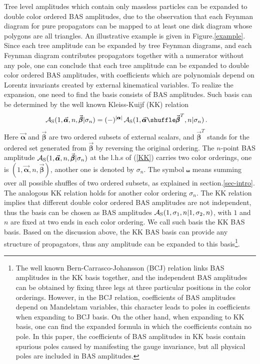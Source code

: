 \documentclass[11pt,a4paper]{article}
\newcommand{\bea}{\begin{eqnarray}}
\newcommand{\eea}{\end{eqnarray}}
\def\eref#1{(\ref{#1})}
\def\a{{\alpha}}
\def\b{{\beta}}
\begin{document}
Tree level amplitudes which contain only massless particles can be expanded to double color ordered BAS amplitudes,
due to the observation that each Feynman diagram for pure propagators can be mapped to at least one disk diagram whose polygons are all triangles. An illustrative example is given in Figure.\ref{example}. Since each tree amplitude can be expanded by tree Feynman diagrams, and each Feynman diagram contributes propagators together with a numerator without any pole, one can conclude that each tree amplitude can be expanded to double color ordered BAS amplitudes, with coefficients which are polynomials depend on Lorentz invariants created by external kinematical variables.
To realize the expansion, one need to find the basis consists of BAS amplitudes.
Such basis can be determined by the well known Kleiss-Kuijf (KK) relation \cite{Kleiss:1988ne}
%
\bea
{\cal A}_{\rm S}(1,\vec{\pmb{\a}},n,\vec{\pmb{\b}}|\sigma_n)=(-)^{|\pmb{\a}|}\,{\cal A}_{\rm S}(1,\vec{\pmb{\a}}\shuffle\vec{\pmb{\b}}^T,n|\sigma_n)\,.~~~\label{KK}
\eea
%
Here $\vec{\pmb{\a}}$ and $\vec{\pmb{\b}}$ are two ordered subsets of external scalars, and $\vec{\pmb{\b}}^T$ stands for the ordered set generated from $\vec{\pmb{\b}}$ by reversing the original ordering. The $n$-point BAS amplitude ${\cal A}_{\rm S}(1,\vec{\pmb{\a}},n,\vec{\pmb{\b}}|\sigma_n)$ at the l.h.s of \eref{KK} carries two color orderings, one is $(1,\vec{\pmb{\a}},n,\vec{\pmb{\b}})$, another one is denoted by $\sigma_n$. The symbol $\shuffle$ means summing over all
possible shuffles of two ordered subsets, as explained in section.\ref{sec-intro}.
The analogous KK relation holds for another color ordering $\sigma_n$.
The KK relation implies that different double color ordered BAS amplitudes are not independent, thus the basis can be chosen as BAS amplitudes
${\cal A}_{\rm S}(1,\sigma_1,n|1,\sigma_2,n)$, with $1$ and $n$ are fixed at two ends in each color ordering. We call such basis the KK BAS basis. Based on the discussion above, the KK BAS basis can provide any structure of propagators, thus any amplitude can be expanded to this basis\footnote{The well known Bern-Carrasco-Johansson (BCJ) relation \cite{Bern:2008qj,Chiodaroli:2014xia,Johansson:2015oia,Johansson:2019dnu} links BAS amplitudes in the KK basis together, and the independent BAS amplitudes can be obtained by fixing three legs at three particular positions in the color orderings. However, in the BCJ relation, coefficients of BAS amplitudes depend on Mandelstam variables, this character leads to poles in coefficients when expanding to BCJ basis. On the other hand, when expanding to KK basis, one can find the expanded formula in which the coefficients contain no pole. In this paper, the coefficients of BAS amplitudes in KK basis contain spurious poles caused by manifesting the gauge invariance, but all physical poles are included in BAS amplitudes.}.
\end{document}
